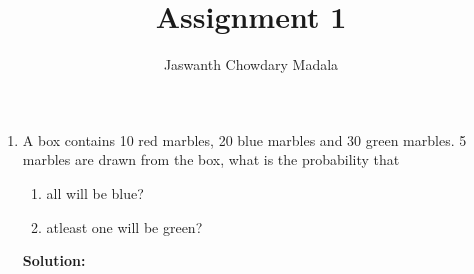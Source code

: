 \documentclass[journal,12pt,twocolumn]{IEEEtran}
\begin{document}
\vspace{3cm}


\title{Assignment 1}
\author{Jaswanth Chowdary Madala}





\maketitle

\newpage


\bigskip

\renewcommand{\thefigure}{\theenumi}
\renewcommand{\thetable}{\theenumi}



\begin{enumerate}
\item A box contains 10 red marbles, 20 blue marbles and 30 green marbles. 5 marbles
are drawn from the box, what is the probability that
\begin{enumerate}
\item all will be blue?
\item atleast one will be green?
\end{enumerate}
\textbf{Solution:}\\


\end{enumerate}
\end{document}
